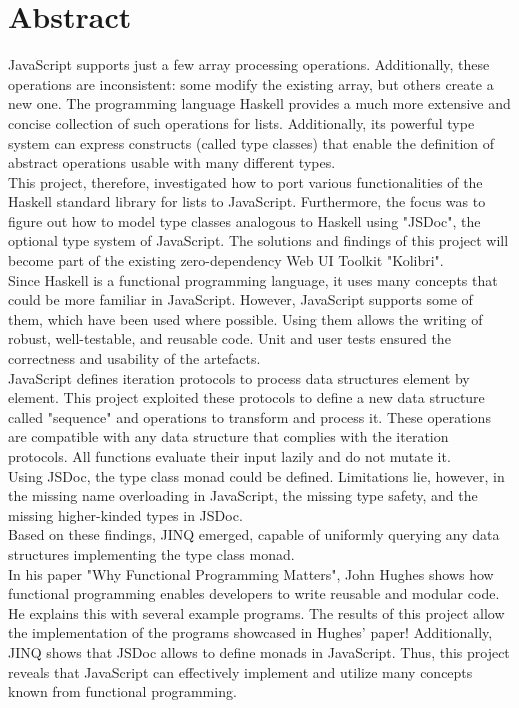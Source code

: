 \chapter*{Abstract}
JavaScript supports just a few array processing operations.
Additionally, these operations are inconsistent: some modify the existing
array, but others create a new one. The programming language Haskell provides a
much more extensive and concise collection of such operations for
lists. Additionally, its powerful type system can express
constructs (called type classes) that enable the definition of abstract
operations usable with many different types.\\ 
This project, therefore, investigated how to port various functionalities of
the Haskell standard library for lists to JavaScript. Furthermore, the focus
was to figure out how to model type classes analogous to Haskell using "JSDoc",
the optional type system of JavaScript. The solutions and
findings of this project will become part of the existing zero-dependency Web
UI Toolkit "Kolibri". \\
Since Haskell is a functional programming language, it uses many concepts that
could be more familiar in JavaScript. However, JavaScript supports some of them,
which have been used where possible. Using them allows the writing
of robust, well-testable, and reusable code. Unit and user tests ensured the
correctness and usability of the artefacts. \\
JavaScript defines iteration protocols to process data structures element by
element. This project exploited these protocols to define a new data structure
called "sequence" and operations to transform and process it. These operations
are compatible with any data structure that complies with the iteration
protocols. All functions evaluate their input lazily and do not mutate it.\\
Using JSDoc, the type class monad could be defined. Limitations lie, however,
in the missing name overloading in JavaScript, the missing type safety, and the
missing higher-kinded types in JSDoc.\\
Based on these findings, JINQ emerged, capable of uniformly querying any data
structures implementing the type class monad.\\
In his paper "Why Functional Programming Matters", John Hughes shows how
functional programming enables developers to write reusable and modular
code. He explains this with several example programs.
The results of this project allow the implementation of the programs showcased
in Hughes' paper! Additionally, JINQ shows that JSDoc allows to define
monads in JavaScript. Thus, this project reveals that JavaScript can
effectively implement and utilize many concepts known from functional
programming.
